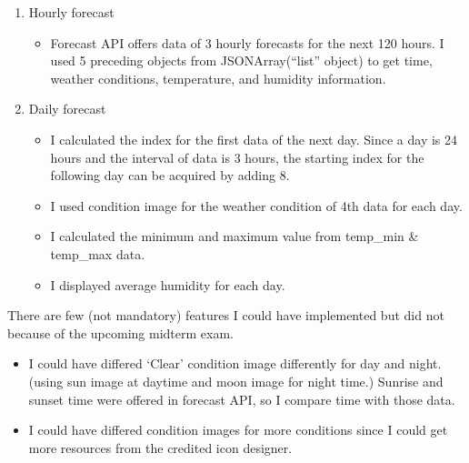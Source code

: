\documentclass[11pt,a4paper]{article}
\begin{document}
\begin{enumerate}
		\item Hourly forecast
		\begin{itemize}
			\item Forecast API offers data of 3 hourly forecasts for the next 120 hours. I used 5 preceding objects from JSONArray(“list” object) to get time, weather conditions, temperature, and humidity information.
		\end{itemize} 
		
		\item Daily forecast
		\begin{itemize}
			\item I calculated the index for the first data of the next day. Since a day is 24 hours and the interval of data is 3 hours, the starting index for the following day can be acquired by adding 8.
			
			\item I used condition image for the weather condition of 4th data for each day.
			
			\item I calculated the minimum and maximum value from temp\_min \& temp\_max data.
			
			\item I displayed average humidity for each day.
		\end{itemize} 
	\end{enumerate}

	There are few (not mandatory) features I could have implemented but did not because of the upcoming midterm exam.
	
	\begin{itemize}
		\item I could have differed ‘Clear’ condition image differently for day and night. (using sun image at daytime and moon image for night time.) Sunrise and sunset time were offered in forecast API, so I compare time with those data.
		\item I could have differed condition images for more conditions since I could get more resources from the credited icon designer. 
	\end{itemize} 	
\end{document}
